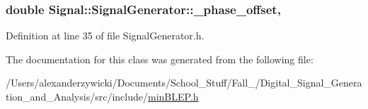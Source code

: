 \hypertarget{class_signal_1_1_signal_generator_a6b4444d46747c8517171edbbf4b5588f}{
\subsubsection[{\+\_\+phase\+\_\+offset}]{\setlength{\rightskip}{0pt plus 5cm}double Signal\+::\+Signal\+Generator\+::\+\_\+phase\+\_\+offset\hspace{0.3cm}{\ttfamily [protected]}, {\ttfamily [inherited]}}}\label{class_signal_1_1_signal_generator_a6b4444d46747c8517171edbbf4b5588f}


Definition at line 35 of file Signal\+Generator.\+h.



The documentation for this class was generated from the following file\+:\begin{DoxyCompactItemize}
\item 
/\+Users/alexanderzywicki/\+Documents/\+School\+\_\+\+Stuff/\+Fall\+\_/\+Digital\+\_\+\+Signal\+\_\+\+Generation\+\_\+and\+\_\+\+Analysis/src/include/\hyperlink{min_b_l_e_p_8h}{min\+B\+L\+E\+P.\+h}\end{DoxyCompactItemize}
